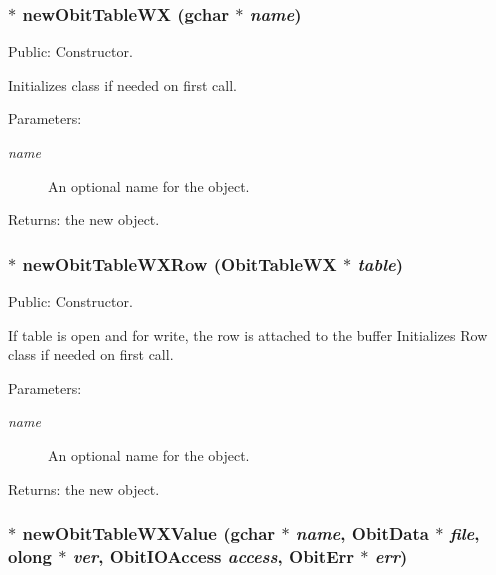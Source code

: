 \subsubsection{$\ast$ new\-Obit\-Table\-WX (gchar $\ast$ {\em name})}\label{ObitTableWX_8c_a16}


Public: Constructor. 

Initializes class if needed on first call. \begin{Desc}
\item[Parameters:]
\begin{description}
\item[{\em name}]An optional name for the object. \end{description}
\end{Desc}
\begin{Desc}
\item[Returns:]the new object. \end{Desc}
\subsubsection{$\ast$ new\-Obit\-Table\-WXRow ({\bf Obit\-Table\-WX} $\ast$ {\em table})}\label{ObitTableWX_8c_a14}


Public: Constructor. 

If table is open and for write, the row is attached to the buffer Initializes Row class if needed on first call. \begin{Desc}
\item[Parameters:]
\begin{description}
\item[{\em name}]An optional name for the object. \end{description}
\end{Desc}
\begin{Desc}
\item[Returns:]the new object. \end{Desc}
\subsubsection{$\ast$ new\-Obit\-Table\-WXValue (gchar $\ast$ {\em name}, {\bf Obit\-Data} $\ast$ {\em file}, {\bf olong} $\ast$ {\em ver}, Obit\-IOAccess {\em access}, {\bf Obit\-Err} $\ast$ {\em err})}\label{ObitTableWX_8c_a18}


